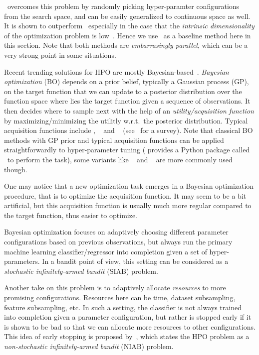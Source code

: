 \documentclass[twoside,11pt]{article}
\begin{document}
\Random\ overcomes this problem by randomly picking hyper-paramter configurations from the search space, and can be easily generalized to continuous space as well. It is shown to outperform \Grid\ especially in the case that the \emph{intrinsic dimensionality} of the optimization problem is low~\citep{bergstra2012random}. Hence we use \Random\ as a baseline method here in this section. Note that both methods are \emph{embarrasingly parallel}, which can be a very strong point in some situations.

Recent trending solutions for HPO are mostly Bayesian-based~\citep{bergstra2011tpe,hutter2011smac,snoek2012spearmint,snoek2015}. \emph{Bayesian optimization} (BO) depends on a prior belief, typically a Gaussian process (GP), on the target function that we can update to a posterior distribution over the function space where lies the target function given a sequence of observations. It then decides where to sample next with the help of an \emph{utility/acquisition function} by maximizing/minimizing the utilitly w.r.t.\ the posterior distribution. Typical acquisition functions include \EI, \PI~\citep{mockus1978} and \GPUCB~\citep{srinivas2010gpucb} (see~\citealt{brochu2010bayesian,shahriari2016loop} for a survey). Note that classical BO methods with GP prior and typical acquisition functions can be applied straightforwardly to hyper-parameter tuning (\citealt{snoek2012spearmint} provides a Python package called \Spearmint\ to perform the task), some variants like \TPE~\citep{bergstra2011tpe} and \SMAC~\citep{hutter2011smac} are more commonly used though.

\begin{remark}
	One may notice that a new optimization task emerges in a Bayesian optimization procedure, that is to optimize the acquisition function. It may seem to be a bit artificial, but this acquisition function is usually much more regular compared to the target function, thus easier to optimize.
\end{remark}

Bayesian optimization focuses on adaptively choosing different parameter configurations based on previous observations, but always run the primary machine learning classifier/regressor into completion given a set of hyper-parameters. In a bandit point of view, this setting can be considered as a \emph{stochastic infinitely-armed bandit} (SIAB) problem.

Another take on this problem is to adaptively allocate \emph{resources} to more promising configurations. Resources here can be time, dataset subsampling, feature subsampling, etc. In such a setting, the classifier is not always trained into completion given a parameter configuration, but rather is stopped early if it is shown to be bad so that we can allocate more resources to other configurations. This idea of early stopping is proposed by~\cite{li2016}, which states the HPO problem as a \emph{non-stochastic infinitely-armed bandit} (NIAB) problem.
\end{document}
